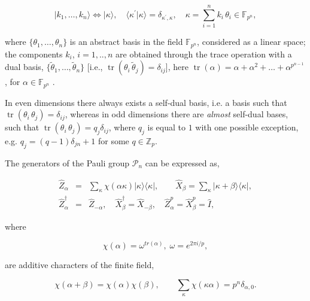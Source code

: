 \documentclass[quantumrep,article,submit,pdftex,moreauthors]{Definitions/mdpi}
\DeclareMathOperator{\tr}{tr}
\begin{document}
\begin{equation}
  |k_{1}, \ldots, k_{n}\rangle
  \Leftrightarrow |\kappa \rangle,
  \quad \langle
  \kappa^{\prime}|\kappa \rangle = \delta_{\kappa^{\prime},\kappa},
  \quad
  \kappa =\sum_{i=1}^{n}k_{i}\,\theta _{i}\in \mathbb{F}_{p^{n}},
  \label{basis}
\end{equation}

where $\{\theta_{1},\ldots,\theta_{n}\}$ is an abstract basis in the
field $\mathbb{F}_{p^{n}}$, considered as a linear space; the components
$k_{i}$, $i=1,..,n$ are obtained through the trace operation with a dual basis,
$\{\tilde{\theta}_{1},\ldots ,\tilde{\theta}_{n}\}$ [i.e.,
$\tr(\theta_{i}\,\tilde{\theta}_{j})=\delta_{ij}$], here $\tr(\alpha) = \alpha
+\alpha ^{2}+\ldots +\alpha ^{p^{n-1}}$, for $\alpha \in \mathbb{F}_{p^{n}}$
\cite{FF}.

In even dimensions there always exists a self-dual basis, i.e. a basis such that
$\tr(\theta _{i}\,\theta _{j})=\delta _{ij}$, whereas in odd dimensions there
are \textit{almost} self-dual bases, such that $\tr(\theta _{i}\,\theta
_{j})=q_{j}\delta _{ij}$, where $q_{j}$ is equal to $1$ with one possible
exception, e.g. $q_{j}=(q-1)\delta_{jn}+1$ for some $q \in \mathbb Z_p$.

The generators of the Pauli group $\mathcal{P}_{n}$ can be expressed as, 

\begin{eqnarray}
  \hat{Z}_{\alpha } &=& \sum_{\kappa }\chi \left( \alpha \kappa \right) |\kappa
  \rangle \langle \kappa|,
  \qquad \hat{X}_{\beta }=\sum_{\kappa }|\kappa + \beta \rangle \langle \kappa|,
  \label{XZ} \\
  \hat{Z}_{\alpha }^{\dagger } &=& \hat{Z}_{-\alpha },
  \quad \hat{X}_{\beta }^{\dagger} = \hat{X}_{-\beta },
  \quad \hat{Z}_{\alpha}^{p} = \hat{X}_{\beta}^{p} = \hat{I},
\end{eqnarray}

where

\begin{equation*}
\chi \left( \alpha \right)
  = \omega ^{tr\left( \alpha \right) },\;\omega
  = e^{2\pi i/p},
\end{equation*}

are additive characters of the finite field, 

\begin{equation*}
  \chi \left( \alpha +\beta \right)
  = \chi \left( \alpha \right) \chi \left( \beta \right),
  \qquad \sum_{\kappa }\chi \left( \kappa \alpha \right)
  = p^{n}\delta _{\alpha, 0}.
\end{equation*}
\end{document}
